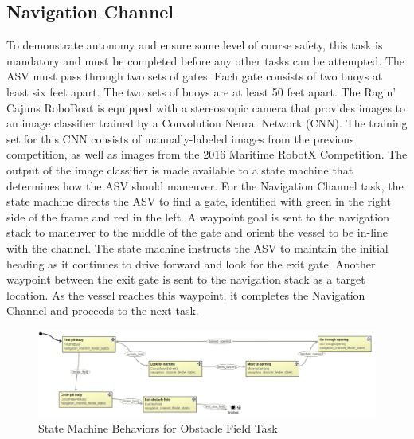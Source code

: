 \documentclass[letterpaper, 12 pt, conference]{ieeeconf}
\begin{document}
\subsection{Navigation Channel}
\label{NavigationChannel}
To demonstrate autonomy and ensure some level of course safety, this task is mandatory and must be completed before any other tasks can be attempted. The ASV must pass through two sets of gates. Each gate consists of two buoys at least six feet apart. The two sets of buoys are at least 50 feet apart. The Ragin' Cajuns RoboBoat is equipped with a stereoscopic camera that provides images to an image classifier trained by a Convolution Neural Network (CNN). The training set for this CNN consists of manually-labeled images from the previous competition, as well as images from the 2016 Maritime RobotX Competition. The output of the image classifier is made available to a state machine that determines how the ASV should maneuver. For the Navigation Channel task, the state machine directs the ASV to find a gate, identified with green in the right side of the frame and red in the left. A waypoint goal is sent to the navigation stack to maneuver to the middle of the gate and orient the vessel to be in-line with the channel. The state machine instructs the ASV to maintain the initial heading as it continues to drive forward and look for the exit gate. Another waypoint between the exit gate is sent to the navigation stack as a target location. As the vessel reaches this waypoint, it completes the Navigation Channel and proceeds to the next task.
%
\begin{figure}[t]
\centering
\vspace{0.05in}
\includegraphics[width=2\columnwidth]{Figures/Obstacle_field_FSM.png}
\caption{State Machine Behaviors for Obstacle Field Task}
\label{fig:ObstacleField}
\end{figure}
%
\end{document}
